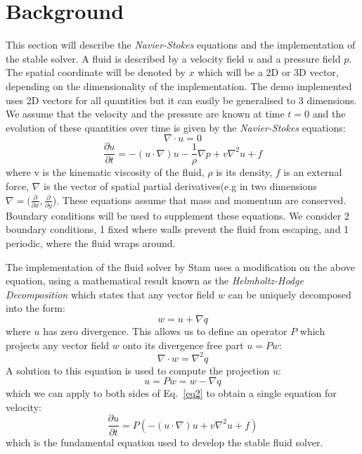 \section{Background}
This section will describe the \emph{Navier-Stokes} equations and the implementation of the stable solver.
A fluid is described by a velocity field $ u $ and a pressure field $ p $. 
The spatial coordinate will be denoted by $ x $ which will be a 2D or 3D vector, depending on the dimensionality of the implementation.
The demo implemented uses 2D vectors for all quantities but it can easily be generalised to 3 dimensions.
We assume that the velocity and the pressure are known at time $ t=0 $ and the evolution of these quantities over time is given by the \emph{Navier-Stokes} equations:
\begin{equation}
  \nabla \cdot u = 0
\end{equation}
\begin{equation}
  \label{eq2}
  \frac{\partial u}{\partial t} = -(u \cdot \nabla)u - \frac{1}{\rho} \nabla p + v \nabla^{2}u + f
\end{equation}
where v is the kinematic viscosity of the fluid, $\rho$ is its density, $f$ is an external force, $\nabla$ is the vector of spatial partial derivatives(e.g in two dimensions $\nabla = (\frac{\partial}{\partial x}, \frac{\partial}{\partial y}$).
These equations assume that mass and momentum are conserved.
Boundary conditions will be used to supplement these equations.
We consider 2 boundary conditions, 1 fixed where walls prevent the fluid from escaping, and 1 periodic, where the fluid wraps around.

The implementation of the fluid solver by Stam uses a modification on the above equation, using a mathematical result known as the \emph{Helmholtz-Hodge Decomposition} which states that any vector field $w$ can be uniquely decomposed into the form:
\begin{equation}
w = u + \nabla q
\end{equation}
where $u$ has zero divergence. This allows us to define an operator $P$ which projects any vector field $w$ onto its divergence free part $u = Pw$:
\begin{equation}
\label{eq4}
\nabla \cdot w = \nabla^{2}q
\end{equation}
A solution to this equation is used to compute the projection $u$:
\begin{equation}
u = P w = w - \nabla q
\end{equation}
which we can apply to both sides of Eq.~\ref{eq2} to obtain a single equation for velocity:
\begin{equation}
  \label{eq5}
  \frac{\partial u}{\partial t} = P(-(u \cdot \nabla)u + v \nabla^{2}u + f)
\end{equation}
which is the fundamental equation used to develop the stable fluid solver.


